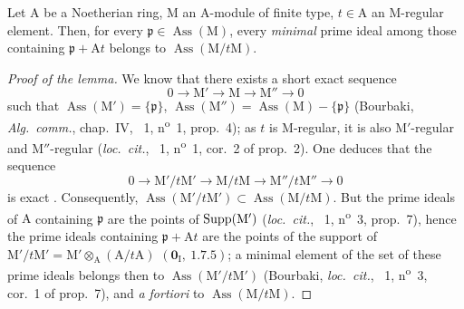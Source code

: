 \begin{lemma}[16.4.6.3]
\label{0.16.4.6.3}
Let $\mathrm{A}$ be a Noetherian ring, $\mathrm{M}$ an $\mathrm{A}$-module of finite type, $t\in\mathrm{A}$ an $\mathrm{M}$-regular element.
Then, for every $\mathfrak{p}\in\operatorname{Ass}(\mathrm{M})$, every \emph{minimal} prime ideal among those containing $\mathfrak{p}+\mathrm{A}t$ belongs to $\operatorname{Ass}(\mathrm{M}/t\mathrm{M})$.
\end{lemma}

\begin{proof}[Proof of the lemma]
We know that there exists a short exact sequence
\[
  0\to\mathrm{M}'\to\mathrm{M}\to\mathrm{M}''\to 0
\]
such that $\operatorname{Ass}(\mathrm{M}')=\{\mathfrak{p}\}$, $\operatorname{Ass}(\mathrm{M}'')=\operatorname{Ass}(\mathrm{M})-\{\mathfrak{p}\}$ (Bourbaki, \emph{Alg.~comm.}, chap.~IV, \textsection~1, n\textsuperscript{o}~1, prop.~4); as $t$ is $\mathrm{M}$-regular, it is also $\mathrm{M}'$-regular and $\mathrm{M}''$-regular (\emph{loc.~cit.}, \textsection~1, n\textsuperscript{o}~1, cor.~2 of prop.~2).
One deduces that the sequence
\[
  0\to\mathrm{M}'/t\mathrm{M}'\to\mathrm{M}/t\mathrm{M}\to\mathrm{M}''/t\mathrm{M}''\to 0
\]
is exact .
Consequently, $\operatorname{Ass}(\mathrm{M}'/t\mathrm{M}')\subset\operatorname{Ass}(\mathrm{M}/t\mathrm{M})$.
But the prime ideals of $\mathrm{A}$ containing $\mathfrak{p}$ are the points of $\operatorname{Supp}(\mathrm{M}')$ (\emph{loc.~cit.}, \textsection~1, n\textsuperscript{o}~3, prop.~7), hence the prime ideals containing $\mathfrak{p}+\mathrm{A}t$ are the points of the support of $\mathrm{M}'/t\mathrm{M}'=\mathrm{M}'\otimes_\mathrm{A}(\mathrm{A}/t\mathrm{A})$ $(\mathbf{0}_\mathrm{I},~1.7.5)$; a minimal element of the set of these prime ideals belongs then to $\operatorname{Ass}(\mathrm{M}'/t\mathrm{M}')$ (Bourbaki, \emph{loc.~cit.}, \textsection~1, n\textsuperscript{o}~3, cor.~1 of prop.~7), and \emph{a fortiori} to $\operatorname{Ass}(\mathrm{M}/t\mathrm{M})$.
\end{proof}

